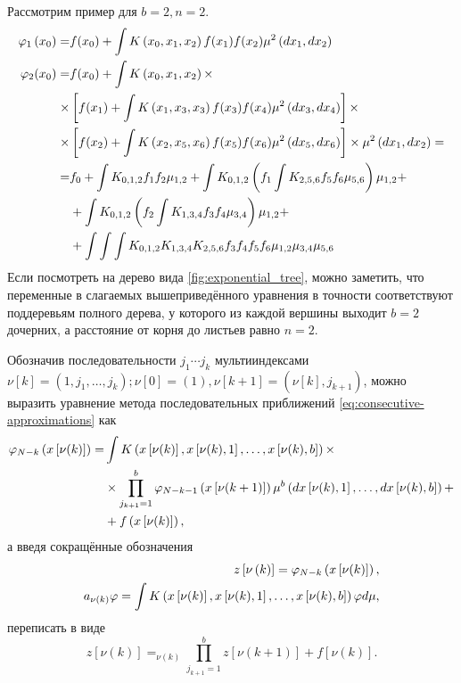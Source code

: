 Рассмотрим пример для $b=2, n=2$.
\begin{align*}
\varphi_1\left(x_0\right) = &f(x_0) + \int K\left(x_0, x_1, x_2\right)f(x_1)f(x_2)\mu^2\left(dx_1,dx_2\right) \\
\varphi_2(x_0) = &f(x_0) + \int K\left(x_0, x_1, x_2\right)\times \\
\times&\left[f(x_1) + \int K\left(x_1, x_3, x_3\right)f(x_3)f(x_4)\mu^2\left(dx_3,dx_4\right)\right]\times \\
\times&\left[
	f(x_2) + \int K\left(x_2, x_5, x_6\right)f(x_5)f(x_6)\mu^2\left(dx_5,dx_6\right)
\right]\times\mu^2\left(dx_1,dx_2\right) =\\
=& f_0 + \int K_{0,1,2}f_1f_2\mu_{1,2} + 
	\int K_{0,1,2}\left(f_1\int K_{2,5,6}f_5f_6\mu_{5,6}\right)\mu_{1,2} + \\
	&+ \int K_{0,1,2}\left(f_2\int K_{1,3,4}f_3f_4\mu_{3,4}\right)\mu_{1,2} + \\
	&+ \int\int\int K_{0,1,2}K_{1,3,4}K_{2,5,6}f_3f_4f_5f_6\mu_{1,2}\mu_{3,4}\mu_{5,6}
\end{align*}
Если посмотреть на дерево вида \ref{fig:exponential_tree}, можно заметить, что переменные в слагаемых вышеприведённого уравнения в точности соответствуют поддеревьям полного дерева, у которого из каждой вершины выходит $b=2$ дочерних, а расстояние от корня до листьев равно $n=2$.

Обозначив последовательности $j_1\cdots j_k$ мультииндексами $\nu[k] = (1, j_1, \ldots, j_k); \nu[0] = (1), \nu[k+1] = (\nu[k], j_{k+1})$, можно выразить уравнение метода последовательных приближений \eqref{eq:consecutive-approximations} как
$$
	\begin{aligned}
		\varphi_{N-k}\left(x\left[\nu(k)\right]\right) = 
		&\int K\left(
			x\left[\nu(k)\right], x\left[\nu(k),1\right], \ldots ,x\left[\nu(k),b\right]
		\right) \times \\
		&\times\prod_{j_{k+1} = 1}^b \varphi_{N-k-1}\left(x\left[\nu(k+1)\right]\right)\mu^b\left(
			dx\left[\nu(k), 1\right],\ldots,dx\left[\nu(k),b\right]
		\right) + \\
		&+ f\left(x\left[\nu(k)\right]\right),
	\end{aligned}
$$
а введя сокращённые обозначения 
$$
	\begin{aligned}
	z\left[\nu\left(k\right)\right] = \varphi_{N-k}\left(x\left[\nu(k)\right]\right), \\
	a_{\nu\left(k\right)}\varphi = \int K\left(
			x\left[\nu(k)\right], x\left[\nu(k),1\right], \ldots ,x\left[\nu(k),b\right]
		\right) \varphi d\mu,
	\end{aligned}
$$
переписать в виде
$$
	z\left[\nu\left(k\right)\right] = _{\nu\left(k\right)}\prod_{j_{k+1} = 1}^b z\left[\nu\left(k+1\right)\right] + f\left[\nu\left(k\right)\right].
$$
